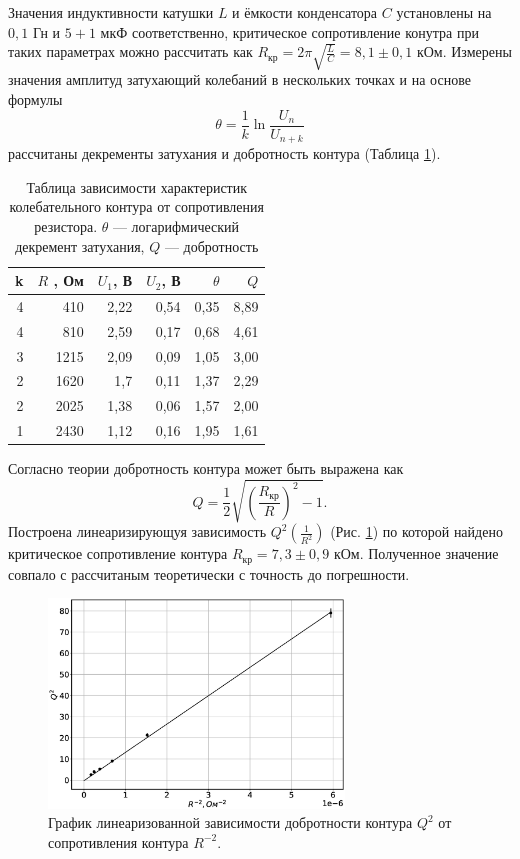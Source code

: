 \documentclass[12pt]{article}
\begin{document}
Значения индуктивности катушки $L$ и ёмкости конденсатора $C$ установлены на $0,1 \text{ Гн}$ и $5 + 1 \text{ мкФ}$ соответственно, 
критическое сопротивление конутра при таких параметрах можно рассчитать как $R_{\text{кр}} = 2\pi \sqrt{\frac{L}{C}} = 8,1 \pm 0,1$ кОм. 
Измерены значения амплитуд затухающий колебаний в нескольких точках и на основе формулы
\[
	\theta = \frac{1}{k} \ln \frac{U_n}{U_{n + k}}
\]
рассчитаны декременты затухания и добротность контура (Таблица \ref{tab:2}).
\begin{table}[H]
	\centering
	\begin{tabular}{|r|r|r|r|r|r|}
		\hline
		k & $R$ , Ом & $U_1$, В & $U_2$, В & $\theta$ & $Q$  \\ \hline
		4 & 410      & 2,22     & 0,54     & 0,35     & 8,89 \\ \hline
		4 & 810      & 2,59     & 0,17     & 0,68     & 4,61 \\ \hline
		3 & 1215     & 2,09     & 0,09     & 1,05     & 3,00 \\ \hline
		2 & 1620     & 1,7      & 0,11     & 1,37     & 2,29 \\ \hline
		2 & 2025     & 1,38     & 0,06     & 1,57     & 2,00 \\ \hline
		1 & 2430     & 1,12     & 0,16     & 1,95     & 1,61 \\ \hline
	\end{tabular}
	\caption{Таблица зависимости характеристик колебательного контура от сопротивления резистора. 
	$\theta$ --- логарифмический декремент затухания, $Q$ --- добротность}
	\label{tab:2}
\end{table}

Согласно теории добротность контура может быть выражена как 
\[
	Q = \frac{1}{2} \sqrt{\left( \frac{R_{\text{кр}}}{R} \right)^2 - 1 }.
\]
Построена линеаризирующуя зависимость $Q^2 \left( \frac{1}{R^2} \right)$ (Рис. \ref{fig:RQ}) по которой найдено критическое 
сопротивление контура $R_{\text{кр}} = 7,3 \pm 0,9$ кОм. Полученное значение совпало с рассчитаным 
теоретически с точность до погрешности. 

\begin{figure}[H]
	\centering
	\includegraphics[width=0.7\textwidth]{RQ.eps}
	\caption{График линеаризованной зависимости добротности контура $Q^2$ от сопротивления контура $R^{-2}$.}
	\label{fig:RQ}
\end{figure}
\end{document}
